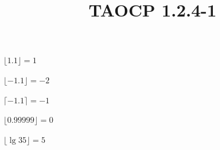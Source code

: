 \documentclass{article}
\title{TAOCP 1.2.4\mbox{-}1}
\begin{document}
\maketitle

\( \lfloor 1.1 \rfloor = 1 \)

\( \lfloor -1.1 \rfloor = -2 \)

\( \lceil -1.1 \rceil = -1 \)

\( \lfloor 0.99999 \rfloor = 0 \)

\( \lfloor \lg{35} \rfloor = 5 \)
\end{document}
